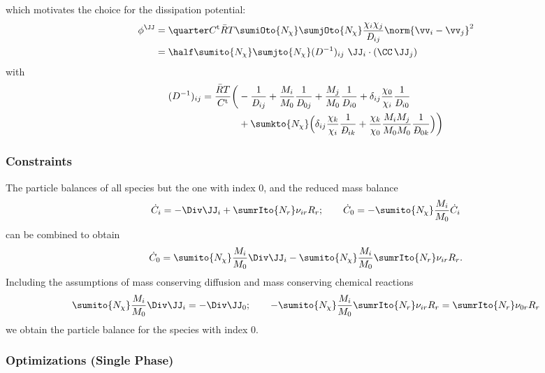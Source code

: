 which motivates the choice for the dissipation potential:
\begin{align}
  \begin{aligned}
  \phiJJ &= \quarter\Ct\RT\sumiOto{\Nchi}\sumjOto{\Nchi} \frac{\chi_i\chi_j}{\DiffMS_{ij}} \norm{\vv_i-\vv_j}^2 \\
         &= \half\sumito{\Nchi}\sumjto{\Nchi} \Dijinv \ \JJ_i \cdot (\CC \, \JJ_j)
  \end{aligned}
\end{align}
with 
\begin{align}
  \begin{aligned}
  \Dijinv = \frac{\RT}{\Ct} 
  \bigg(  
    &- \frac{1}{\DiffMS_{ij}} 
    + \frac{M_i}{M_0}\frac{1}{\DiffMS_{0j}} 
    + \frac{M_j}{M_0}\frac{1}{\DiffMS_{i0}}  
    + \delta_{ij}\frac{\chi_0}{\chi_i}\frac{1}{\DiffMS_{i0}} \\
    &+ \sumkto{\Nchi} \Big( \delta_{ij} \frac{\chi_k}{\chi_i}\frac{1}{\DiffMS_{ik}} + \frac{\chi_k}{\chi_0}\frac{M_i M_j}{M_0 M_0} \frac{1}{\DiffMS_{0k}} \Big) 
  \bigg)
  \end{aligned}
\end{align}

\subsubsection{Constraints} \label{app:constraints}

The particle balances of all species but the one with index 0, and the reduced mass balance
\begin{align}
  \dot C_i  =  - \Div \JJ_i + \sumrIto{N_r} \nuir R_r; \qquad \dot C_0= -\sumito{\Nchi} \frac{M_i}{M_0} \dot C_i
\end{align}
can be combined to obtain
\begin{align}
  \dot C_0 = \sumito{\Nchi} \frac{M_i}{M_0} \Div\JJ_i - \sumito{\Nchi} \frac{M_i}{M_0} \sumrIto{N_r}\nuir R_r. 
\end{align}
Including the assumptions of mass conserving diffusion and mass conserving chemical reactions
\begin{align}
  \sumito{\Nchi} \frac{M_i}{M_0} \Div\JJ_i = -\Div\JJ_0; \qquad -\sumito{\Nchi} \frac{M_i}{M_0} \sumrIto{N_r}\nuir R_r = \sumrIto{N_r} \nu_{0r}R_r 
\end{align}
we obtain the particle balance for the species with index 0.

\subsubsection{Optimizations (Single Phase)} \label{app:Opt}
